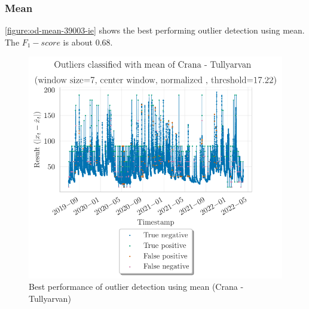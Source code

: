 \subsubsection{Mean}
\autoref{figure:od-mean-39003-ie} shows the best performing outlier detection using mean. The $F_1-score$ is about 0.68. %
\begin{figure}[htp]
    \centering 
    \includegraphics{plots/pdfs/39003-ie/od_mean_39003-ie_all.pdf}
    \caption{Best performance of outlier detection using mean (Crana - Tullyarvan)}
    \label{figure:od-mean-39003-ie}
\end{figure}

